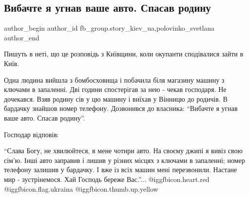  
 
 
 
 
 
\subsection{Вибачте я угнав ваше авто. Спасав родину}
\label{sec:01_05_2022.fb.fb_group.story_kiev_ua.1.ugon_avto}
 
\ifcmt
 author_begin
   author_id fb_group.story_kiev_ua,polovinko_svetlana
 author_end
\fi


Пишуть в неті, що це розповідь з Київщини, коли окупанти сподівалися зайти в
Київ.


Одна людина вийшла з бомбосховища і побачила біля магазину машину з ключами в
запаленні. Дві години спостерігав за нею - чекав господаря. Не дочекався. Взяв
родину сів у цю машину і виїхав у Вінницю до родичів. В бардачку знайшов номер
телефону. Дозвонився до власника: \enquote{Вибачте я угнав ваше авто. Спасав
родину}.

Господар відповів:

\enquote{Слава Богу, не хвилюйтеся, в мене чотири авто. На своєму джипі я вивіз
свою сім'ю. Інші авто заправив і лишив у різних місцях з ключами в запаленні;
номер телефону залишив у бардачку. І вже із всіх машин мені перезвонили.
Настане мир - зустрінемося. Хай Господь береже Вас.}... @igg{fbicon.heart.red}
@igg{fbicon.flag.ukraina} @igg{fbicon.thumb.up.yellow}

